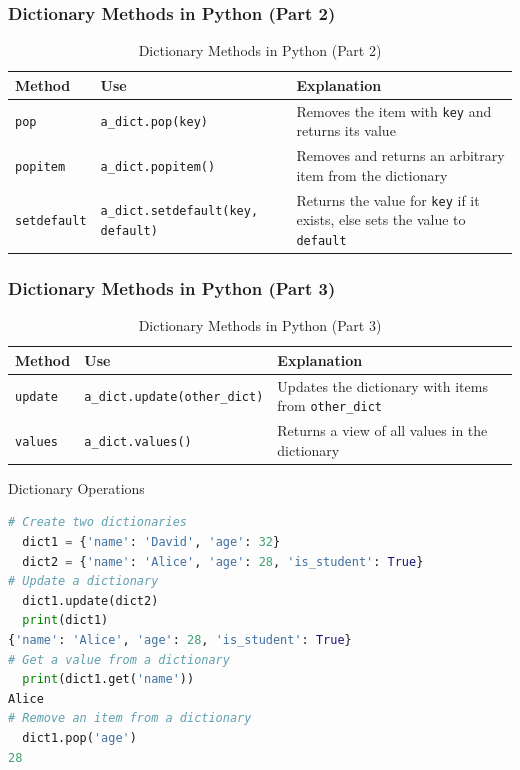 \begin{frame}
\frametitle{Dictionary Methods in Python (Part 2)}
\begin{table}[]
    \centering
    \begin{tabular}{|l|p{4.3cm}|p{4cm}|}
        \hline
        \textbf{Method} & \textbf{Use} & \textbf{Explanation} \\ \hline
        \texttt{pop} & \texttt{a\_dict.pop(key)} & Removes the item with \texttt{key} and returns its value \\ \hline
        \texttt{popitem} & \texttt{a\_dict.popitem()} & Removes and returns an arbitrary item from the dictionary \\ \hline
        \texttt{setdefault} & \texttt{a\_dict.setdefault(key, default)} & Returns the value for \texttt{key} if it exists, else sets the value to \texttt{default} \\ \hline
    \end{tabular}
    \caption{Dictionary Methods in Python (Part 2)}
\end{table}
\end{frame}


\begin{frame}
\frametitle{Dictionary Methods in Python (Part 3)}
\begin{table}[]
    \centering
    \begin{tabular}{|l|p{5cm}|p{4cm}|}
        \hline
        \textbf{Method} & \textbf{Use} & \textbf{Explanation} \\ \hline
        \texttt{update} & \texttt{a\_dict.update(other\_dict)} & Updates the dictionary with items from \texttt{other\_dict} \\ \hline
        \texttt{values} & \texttt{a\_dict.values()} & Returns a view of all values in the dictionary \\ \hline
    \end{tabular}
    \caption{Dictionary Methods in Python (Part 3)}
\end{table}
\end{frame}

\begin{frame}[fragile]{Dictionary Operations}
    \begin{lstlisting}[language=Python]
# Create two dictionaries
  dict1 = {'name': 'David', 'age': 32}
  dict2 = {'name': 'Alice', 'age': 28, 'is_student': True}
# Update a dictionary
  dict1.update(dict2)
  print(dict1)
{'name': 'Alice', 'age': 28, 'is_student': True}
# Get a value from a dictionary
  print(dict1.get('name'))
Alice
# Remove an item from a dictionary
  dict1.pop('age')
28
    \end{lstlisting}
\end{frame}


